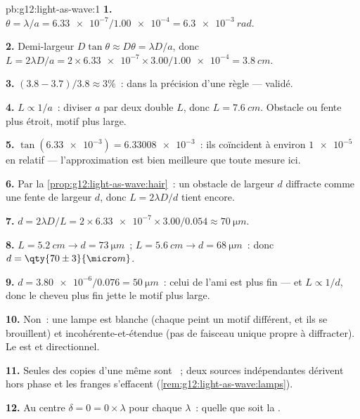\begin{solution}{pb:g12:light-as-wave:1}
\textbf{1.} $\theta = \lambda/a = \num{6.33e-7}/\num{1.00e-4} =
\qty{6.3e-3}{rad}$.

\textbf{2.} Demi-largeur $D\tan\theta \approx D\theta = \lambda D/a$,
donc $L = 2\lambda D/a = 2 \times \num{6.33e-7} \times
3.00/\num{1.00e-4} = \qty{3.8}{cm}$.

\textbf{3.} $(3.8 - 3.7)/3.8 \approx 3\%$~: dans la précision d'une
règle --- validé.

\textbf{4.} $L \propto 1/a$~: diviser $a$ par deux double $L$, donc
$L = \qty{7.6}{cm}$. Obstacle ou fente plus étroit, motif plus large.

\textbf{5.} $\tan(\num{6.33e-3}) = \num{6.33008e-3}$~: ils coïncident à
environ $\num{1e-5}$ en relatif --- l'approximation est bien meilleure
que toute mesure ici.

\textbf{6.} Par la \cref{prop:g12:light-as-wave:hair}~: un obstacle de
largeur $d$ diffracte comme une fente de largeur $d$, donc
$L = 2\lambda D/d$ tient encore.

\textbf{7.} $d = 2\lambda D/L = 2 \times \num{6.33e-7} \times
3.00/0.054 \approx \qty{70}{\micro m}$.

\textbf{8.} $L = \qty{5.2}{cm} \to d = \qty{73}{\micro m}$~;
$L = \qty{5.6}{cm} \to d = \qty{68}{\micro m}$~: donc
$d = \qty{70 \pm 3}{\micro m}$.

\textbf{9.} $d = \num{3.80e-6}/0.076 = \qty{50}{\micro m}$~: celui de
l'ami est plus fin --- et $L \propto 1/d$, donc le cheveu plus fin
jette le motif plus large.

\textbf{10.} Non~: une lampe est blanche (chaque
 peint un motif différent, et ils se
brouillent) et incohérente-et-étendue (pas de faisceau unique propre à
diffracter). Le  est  et
directionnel.

\textbf{11.} Seules des copies d'une même  sont
~; deux sources indépendantes dérivent hors
phase et les franges s'effacent (\cref{rem:g12:light-as-wave:lamps}).

\textbf{12.} Au centre $\delta = 0 = 0 \times \lambda$ pour chaque
$\lambda$~:  quelle que soit la
.


\end{solution}
